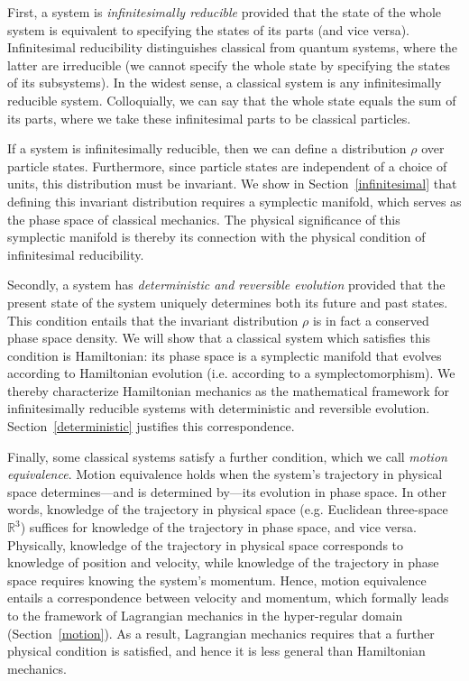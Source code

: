 \documentclass[letterpaper]{article}
\begin{document}
First, a system is \textit{infinitesimally reducible} provided that the state of the whole system is equivalent to specifying the states of its parts (and vice versa). Infinitesimal reducibility distinguishes classical from quantum systems, where the latter are irreducible (we cannot specify the whole state by specifying the states of its subsystems). In the widest sense, a classical system is any infinitesimally reducible system. Colloquially, we can say that the whole state equals the sum of its parts, where we take these infinitesimal parts to be classical particles. 

If a system is infinitesimally reducible, then we can define a distribution $\rho$ over particle states. Furthermore, since particle states are independent of a choice of units, this distribution must be invariant. We show in Section~\ref{infinitesimal} that defining this invariant distribution requires a symplectic manifold, which serves as the phase space of classical mechanics. The physical significance of this symplectic manifold is thereby its connection with the physical condition of infinitesimal reducibility. 

Secondly, a system has \textit{deterministic and reversible evolution} provided that the present state of the system uniquely determines both its future and past states. This condition entails that the invariant distribution $\rho$ is in fact a conserved phase space density. We will show that a classical system which satisfies this condition is Hamiltonian: its phase space is a symplectic manifold that evolves according to Hamiltonian evolution  (i.e. according to a symplectomorphism). We thereby characterize Hamiltonian mechanics as the mathematical framework for infinitesimally reducible systems with deterministic and reversible evolution. Section~\ref{deterministic} justifies this correspondence. 

Finally, some classical systems satisfy a further condition, which we call \textit{motion equivalence}. Motion equivalence holds when the system's trajectory in physical space determines---and is determined by---its evolution in phase space. In other words, knowledge of the trajectory in physical space (e.g. Euclidean three-space $\mathbb{R}^3$) suffices for knowledge of the trajectory in phase space, and vice versa. Physically, knowledge of the trajectory in physical space corresponds to knowledge of position and velocity, while knowledge of the trajectory in phase space requires knowing the system's momentum. Hence, motion equivalence entails a correspondence between velocity and momentum, which formally leads to the framework of Lagrangian mechanics in the hyper-regular domain (Section~\ref{motion}). As a result, Lagrangian mechanics requires that a further physical condition is satisfied, and hence it is less general than Hamiltonian mechanics. 
\end{document}
